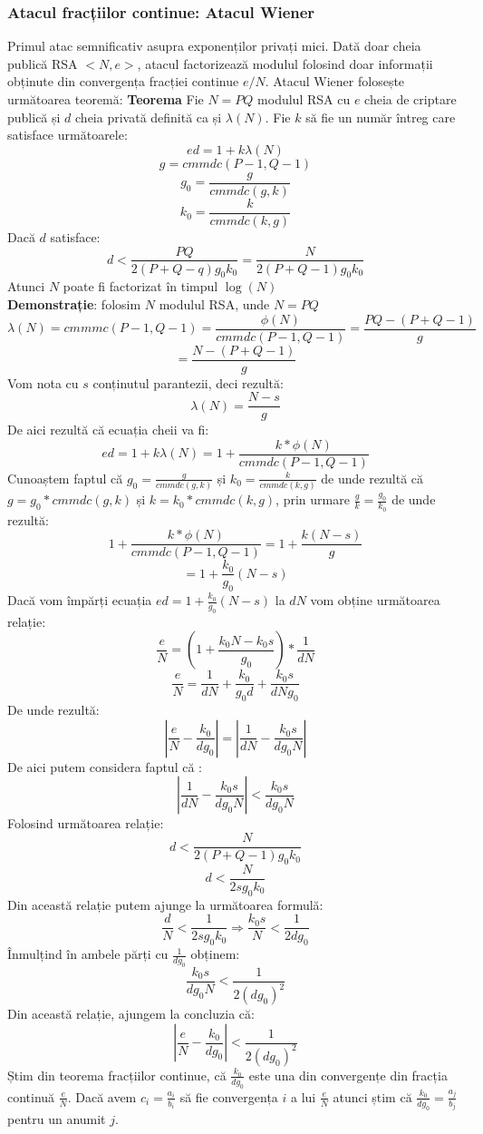 \documentclass[12]{article}
\begin{document}
\subsubsection{Atacul fracțiilor continue: Atacul Wiener}
Primul atac semnificativ asupra exponenților privați mici. Dată doar cheia publică RSA $<N,e>$, atacul factorizează modulul folosind doar informații obținute din convergența fracției continue $e/N$. Atacul Wiener folosește următoarea teoremă:
\textbf{Teorema} Fie $N=PQ$ modulul RSA cu $e$ cheia de criptare publică și $d$ cheia privată definită ca și $\lambda(N)$. Fie $k$ să fie un număr întreg care satisface următoarele:
$$ ed=1+k \lambda(N)$$
$$ g=cmmdc(P-1,Q-1) $$
$$g_0=\frac{g}{cmmdc(g,k)}$$
$$k_0=\frac{k}{cmmdc(k,g)}$$
Dacă $d$ satisface:
$$ d< \frac{PQ}{2(P+Q-q)g_0k_0} = \frac{N}{2(P+Q-1)g_0k_0}$$
Atunci $N$ poate fi factorizat în timpul $\log(N)$ \\
\textbf{Demonstrație}: folosim $N$ modulul RSA, unde $N=PQ$
$$ \lambda(N)=cmmmc(P-1,Q-1)=\frac{\phi(N)}{cmmdc(P-1,Q-1)}=\frac{PQ - (P+Q-1)}{g}$$
$$ = \frac{N - (P+Q-1)}{g}$$
Vom nota cu $s$ conținutul parantezii, deci rezultă:
$$ \lambda(N) = \frac{N-s}{g}$$
De aici rezultă că ecuația cheii va fi:
$$ed = 1 +k \lambda(N)= 1+ \frac{k* \phi(N)}{cmmdc(P-1,Q-1)} $$
Cunoaștem faptul că  $g_0 = \frac{g}{cmmdc(g,k)}$ și $k_0=\frac{k}{cmmdc(k,g)}$ de unde rezultă că $g=g_0 * cmmdc(g,k)$ și $k=k_0 * cmmdc(k,g)$, prin urmare $\frac{g}{k} = \frac{g_0}{k_0}$ de unde rezultă:
$$ 1+ \frac{k* \phi(N)}{cmmdc(P-1,Q-1)} = 1+ \frac{k (N-s)}{g} $$
$$ = 1+ \frac{k_0}{g_0} (N-s)$$
Dacă vom împărți ecuația $ed= 1+ \frac{k_0}{g_0} (N-s)$ la $dN$ vom obține următoarea relație:
$$ \frac{e}{N} = \left(  1+ \frac{k_0N - k_0s}{g_0}   \right) * \frac{1}{dN} $$
$$ \frac{e}{N} = \frac{1}{dN} + \frac{k_0}{g_0 d} +\frac{k_0s}{dNg_0}$$
De unde rezultă:
$$ \left |  \frac{e}{N} - \frac{k_0}{dg_0} \right| = \left| \frac{1}{dN} - \frac{k_0s}{dg_0N} \right| $$
De aici putem considera faptul că :
$$ \left| \frac{1}{dN} - \frac{k_0s}{dg_0N} \right| < \frac{k_0s}{dg_0N}$$
Folosind următoarea relație:
$$ d< \frac{N}{2(P+Q-1)g_0k_0}  $$
$$ d < \frac{N}{2sg_0k_0}$$
Din această relație putem ajunge la următoarea formulă:
$$ \frac{d}{N} < \frac{1}{2sg_0k_0} \Rightarrow \frac{k_0s}{N} < \frac{1}{2dg_0}$$
Înmulțind în ambele părți cu $\frac{1}{dg_0}$ obținem:
$$ \frac{k_0s}{dg_0N} < \frac{1}{2(dg_0)^2}$$
Din această relație, ajungem la concluzia că:
$$ \left| \frac{e}{N} - \frac{k_0}{dg_0} \right| < \frac{1}{2(dg_0)^2}$$
Știm din teorema fracțiilor continue, că $\frac{k_0}{dg_0}$ este una din convergențe din fracția continuă $\frac{e}{N}$. Dacă avem $c_i = \frac{a_i}{b_i}$ să fie convergența $i$ a lui $\frac{e}{N}$ atunci știm că $\frac{k_0}{dg_0} = \frac{a_j}{b_j}$ pentru un anumit $j$. \\
\end{document}
